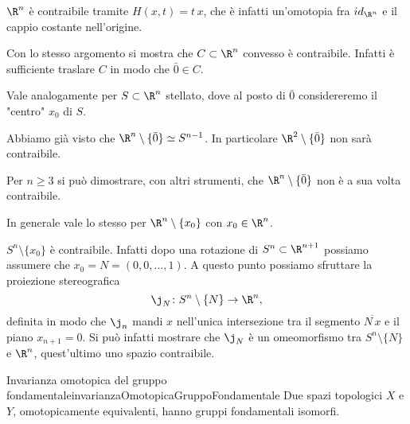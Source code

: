 \begin{ese}
	\(\R^n\) è contraibile tramite \(H(x,t) = t\,x\), che è infatti un'omotopia fra \(id_{\R^n}\) e il cappio costante nell'origine.
\end{ese}

\begin{ese}
	Con lo stesso argomento si mostra che \(C\subset \R^n\) convesso è contraibile.
	Infatti è sufficiente traslare \(C\) in modo che \(\bar{0}\in C\).
\end{ese}

\begin{oss}
	Vale analogamente per \(S\subset \R^n\) stellato, dove al posto di \(\bar{0}\) considereremo il "centro" \(x_0\) di \(S\).
\end{oss}

\begin{ese}
	Abbiamo già visto che \(\R^n\setminus\{\bar{0}\} \simeq S^{n-1}\).
	In particolare \(\R^2\setminus\{\bar{0}\}\) non sarà contraibile.
\end{ese}

\begin{oss}
	Per \(n\ge 3\) si può dimostrare, con altri strumenti, che \(\R^n\setminus\{\bar{0}\}\) non è a sua volta contraibile.

	In generale vale lo stesso per \(\R^n \setminus \{x_0\}\) con \(x_0\in \R^n\).
\end{oss}

\begin{ese}
	\(S^n \setminus \{x_0\}\) è contraibile.
	Infatti dopo una rotazione di \(S^n \subset \R^{n+1}\) possiamo assumere che \(x_0 = N = (0,0,\ldots,1)\).
	A questo punto possiamo sfruttare la proiezione stereografica
	\[
		\j_N \colon S^n \setminus\{N\} \to \R^n,
	\]
	definita in modo che \(\j_n\) mandi \(x\) nell'unica intersezione tra il segmento \(\overline{N\,x}\) e il piano \(x_{n+1}=0\).
	Si può infatti mostrare che \(\j_N\) è un omeomorfismo tra \(S^n\setminus\{N\}\) e \(\R^n\), quest'ultimo uno spazio contraibile.
\end{ese}

\begin{teor}{Invarianza omotopica del gruppo fondamentale}{invarianzaOmotopicaGruppoFondamentale}
	Due spazi topologici \(X\) e \(Y\), omotopicamente equivalenti, hanno gruppi fondamentali isomorfi.
\end{teor}
%
%
